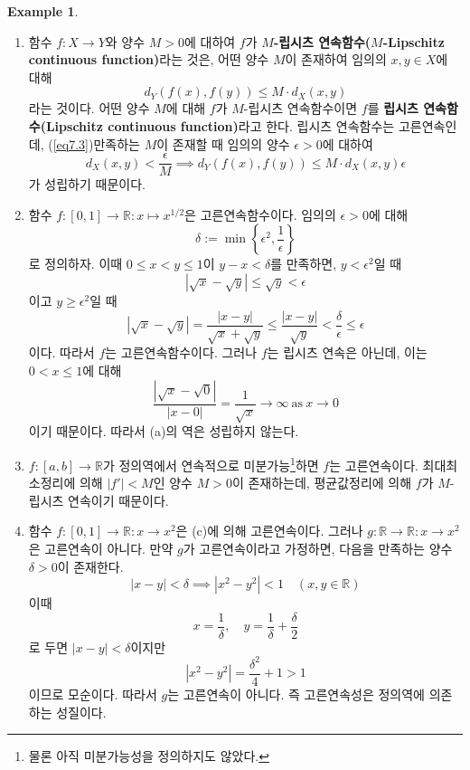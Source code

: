 \documentclass[11pt]{book}
\numberwithin{equation}{chapter}
\def\RR{\mathbb{R}}
\def\eps{\epsilon}
\newcommand{\abs}[1]{\left\vert#1\right\vert}
\theoremstyle{definition}
\newtheorem*{ex}{Example}
\newenvironment{enum}
	{\begin{enumerate}[label=(\alph*), leftmargin=2\parindent]}
	{\end{enumerate}}
\begin{document}
\begin{ex}
    \quad 

    \begin{enum}
        \item 함수 \(f : X \to Y\)와 양수 \(M > 0\)에 대하여 \(f\)가 \textbf{\(M\)-립시츠 연속함수(\(M\)-Lipschitz continuous function)}라는 것은, 어떤 양수 \(M\)이 존재하여 임의의 \(x, y \in X\)에 대해
        \begin{equation} \label{eq7.3}
            d_Y(f(x), f(y)) \le M \cdot d_X(x, y)    
        \end{equation}
        라는 것이다. 어떤 양수 \(M\)에 대해 \(f\)가 \(M\)-립시츠 연속함수이면 \(f\)를 \textbf{립시츠 연속함수(Lipschitz continuous function)}라고 한다. 립시츠 연속함수는 고른연속인데, (\ref{eq7.3})\을 만족하는 \(M\)이 존재할 때 임의의 양수 \(\eps > 0\)에 대하여
        \[
        d_X(x, y) < \frac{\eps}{M} \implies d_Y(f(x), f(y)) \le M \cdot d_X(x, y) \eps    
        \]    
        가 성립하기 때문이다.
        \item 함수 \(f : [0, 1] \to \RR : x \mapsto x^{1/2}\)은 고른연속함수이다. 임의의 \(\eps > 0\)에 대해
        \[
        \delta := \min \left\{\eps^2, \frac{1}{\eps}\right\}  
        \]
        로 정의하자. 이때 \(0 \le x < y \le 1\)이 \(y - x < \delta\)를 만족하면, \(y < \eps^2\)일 때
        \[
            \abs{\sqrt{x} - \sqrt{y}} \le \sqrt{y} < \eps
        \]
        이고 \(y \ge \eps^2\)일 때
        \[
            \abs{\sqrt{x} - \sqrt{y}} = \frac{\abs{x-y}}{\sqrt{x} + \sqrt{y}} \le \frac{\abs{x-y}}{\sqrt{y}} < \frac{\delta}{\eps} \le \eps
        \]
        이다. 따라서 \(f\)는 고른연속함수이다. 그러나 \(f\)는 립시츠 연속은 아닌데, 이는 \(0 < x \le 1\)에 대해
        \[
        \frac{\abs{\sqrt{x} - \sqrt{0}}}{\abs{x-0}} = \frac{1}{\sqrt{x}}\to \infty \ \text{as} \ x \to 0    
        \]
        이기 때문이다. 따라서 (a)의 역은 성립하지 않는다.
        \item \(f : [a, b] \to \RR\)가 정의역에서 연속적으로 미분가능\footnote{물론 아직 미분가능성을 정의하지도 않았다.}하면 \(f\)는 고른연속이다. 최대최소정리에 의해 \(\abs{f'} < M\)인 양수 \(M > 0\)이 존재하는데, 평균값정리에 의해 \(f\)가 \(M\)-립시츠 연속이기 때문이다.
        \item 함수 \(f : [0, 1] \to \RR : x \to x^2\)은 (c)에 의해 고른연속이다. 그러나 \(g : \RR \to \RR : x \to x^2\)은 고른연속이 아니다. 만약 \(g\)가 고른연속이라고 가정하면, 다음을 만족하는 양수 \(\delta > 0\)이 존재한다.
        \[
        \abs{x - y} < \delta \implies \abs{x^2 - y^2} < 1 \quad (x, y \in \RR)    
        \]
        이때
        \[
        x = \frac{1}{\delta}, \quad y = \frac{1}{\delta} + \frac{\delta}{2}    
        \]
        로 두면 \(\abs{x-y} < \delta\)이지만
        \[
        \abs{x^2 - y^2} = \frac{\delta^2}{4} + 1 > 1    
        \]
        이므로 모순이다. 따라서 \(g\)는 고른연속이 아니다. 즉 고른연속성은 정의역에 의존하는 성질이다.
    \end{enum}
\end{ex}
\end{document}
